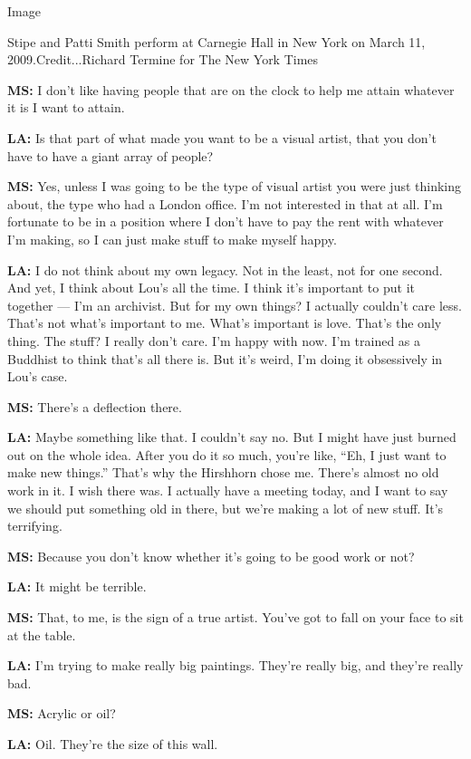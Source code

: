 Image

Stipe and Patti Smith perform at Carnegie Hall in New York on March 11,
2009.Credit...Richard Termine for The New York Times

\textbf{MS:} I don't like having people that are on the clock to help me
attain whatever it is I want to attain.

\textbf{LA:} Is that part of what made you want to be a visual artist,
that you don't have to have a giant array of people?

\textbf{MS:} Yes, unless I was going to be the type of visual artist you
were just thinking about, the type who had a London office. I'm not
interested in that at all. I'm fortunate to be in a position where I
don't have to pay the rent with whatever I'm making, so I can just make
stuff to make myself happy.

\textbf{LA:} I do not think about my own legacy. Not in the least, not
for one second. And yet, I think about Lou's all the time. I think it's
important to put it together --- I'm an archivist. But for my own
things? I actually couldn't care less. That's not what's important to
me. What's important is love. That's the only thing. The stuff? I really
don't care. I'm happy with now. I'm trained as a Buddhist to think
that's all there is. But it's weird, I'm doing it obsessively in Lou's
case.

\textbf{MS:} There's a deflection there.

\textbf{LA:} Maybe something like that. I couldn't say no. But I might
have just burned out on the whole idea. After you do it so much, you're
like, ``Eh, I just want to make new things.'' That's why the Hirshhorn
chose me. There's almost no old work in it. I wish there was. I actually
have a meeting today, and I want to say we should put something old in
there, but we're making a lot of new stuff. It's terrifying.

\textbf{MS:} Because you don't know whether it's going to be good work
or not?

\textbf{LA:} It might be terrible.

\textbf{MS:} That, to me, is the sign of a true artist. You've got to
fall on your face to sit at the table.

\textbf{LA:} I'm trying to make really big paintings. They're really
big, and they're really bad.

\textbf{MS:} Acrylic or oil?

\textbf{LA:} Oil. They're the size of this wall.

